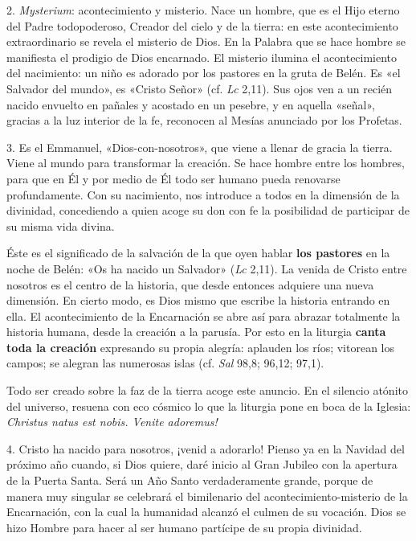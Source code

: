 \documentclass[]{article}
\begin{document}
2. \emph{Mysterium}: acontecimiento y misterio. Nace un hombre, que es
el Hijo eterno del Padre todopoderoso, Creador del cielo y de la tierra:
en este acontecimiento extraordinario se revela el misterio de Dios. En
la Palabra que se hace hombre se manifiesta el prodigio de Dios
encarnado. El misterio ilumina el acontecimiento del nacimiento: un niño
es adorado por los pastores en la gruta de Belén. Es «el Salvador del
mundo», es «Cristo Señor» (cf. \emph{Lc} 2,11). Sus ojos ven a un recién
nacido envuelto en pañales y acostado en un pesebre, y en aquella
«señal», gracias a la luz interior de la fe, reconocen al Mesías
anunciado por los Profetas.

3. Es el Emmanuel, «Dios-con-nosotros», que viene a llenar de gracia la
tierra. Viene al mundo para transformar la creación. Se hace hombre
entre los hombres, para que en Él y por medio de Él todo ser humano
pueda renovarse profundamente. Con su nacimiento, nos introduce a todos
en la dimensión de la divinidad, concediendo a quien acoge su don con fe
la posibilidad de participar de su misma vida divina.

Éste es el significado de la salvación de la que oyen hablar \textbf{los
pastores} en la noche de Belén: «Os ha nacido un Salvador» (\emph{Lc}
2,11). La venida de Cristo entre nosotros es el centro de la historia,
que desde entonces adquiere una nueva dimensión. En cierto modo, es Dios
mismo que escribe la historia entrando en ella. El acontecimiento de la
Encarnación se abre así para abrazar totalmente la historia humana,
desde la creación a la parusía. Por esto en la liturgia \textbf{canta
toda la creación} expresando su propia alegría: aplauden los ríos;
vitorean los campos; se alegran las numerosas islas (cf. \emph{Sal}
98,8; 96,12; 97,1).

Todo ser creado sobre la faz de la tierra acoge este anuncio. En el
silencio atónito del universo, resuena con eco cósmico lo que la
liturgia pone en boca de la Iglesia: \emph{Christus natus est nobis.
Venite adoremus!}

4. Cristo ha nacido para nosotros, ¡venid a adorarlo! Pienso ya en la
Navidad del próximo año cuando, si Dios quiere, daré inicio al Gran
Jubileo con la apertura de la Puerta Santa. Será un Año Santo
verdaderamente grande, porque de manera muy singular se celebrará el
bimilenario del acontecimiento-misterio de la Encarnación, con la cual
la humanidad alcanzó el culmen de su vocación. Dios se hizo Hombre para
hacer al ser humano partícipe de su propia divinidad.
\end{document}
